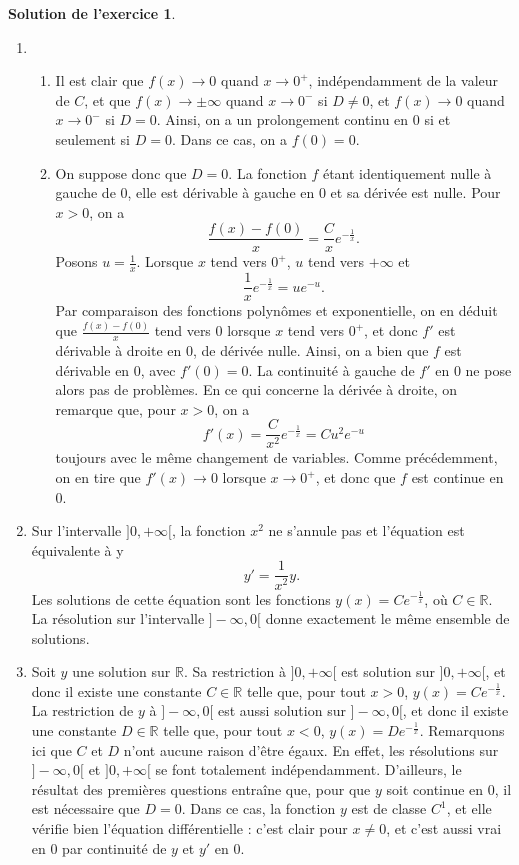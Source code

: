 \documentclass[a4paper, 11pt,openany]{article}%
\theoremstyle{plain}
\theoremstyle{definition}
\newtheorem{sol}{Solution de l'exercice}
\theoremstyle{remark}
\newcommand{\R}{\mathbb{R}}
\begin{document}
\begin{sol}
\begin{enumerate}
\item 
\begin{enumerate}
\item Il est clair que $f(x) \to 0$ quand $x \to 0^+$, indépendamment de la valeur de $C$, et que $f(x) \to \pm \infty$ quand $x \to 0^-$ si $D \neq 0$, et $f(x) \to 0$ quand $x \to 0^-$ si $D=0$. Ainsi, on a un prolongement continu en 0 si et seulement si $D=0$. Dans ce cas, on a $f(0)=0$. 
\item On suppose donc que $D=0$. La fonction $f$ étant identiquement nulle à gauche de 0, elle est dérivable à gauche en 0 et sa dérivée est nulle. Pour $x>0$, on a 
\[ \frac{f(x)-f(0)}{x}=\frac{C}{x} e^{-\frac{1}{x}}.\]
Posons $u= \frac{1}{x}$. Lorsque $x$ tend vers $0^+$, $u$ tend vers $+\infty$ et \[ \frac{1}{x} e^{- \frac{1}{x}} = u e^{-u}.\]
Par comparaison des fonctions polynômes et exponentielle, on en déduit que $\frac{f(x)-f(0)}{x}$ tend vers 0 lorsque $x$ tend vers $0^+$, et donc $f'$ est dérivable à droite en 0, de dérivée nulle. Ainsi, on a bien que $f$ est dérivable en 0, avec $f'(0)=0$. La continuité à gauche de $f'$ en 0 ne pose alors pas de problèmes. En ce qui concerne la dérivée à droite, on remarque que, pour $x>0$, on a \[ f'(x)=\frac{C}{x^2} e^{-\frac{1}{x}} = Cu^2 e^{-u}\]
toujours avec le même changement de variables. Comme précédemment, on en tire que $f'(x) \to 0$ lorsque $x \to 0^+$, et donc que $f$ est continue en 0. 
\end{enumerate}
\item Sur l'intervalle $]0,+\infty[$, la fonction $x^2$ ne s'annule pas et l'équation est équivalente à y
\[ y'= \frac{1}{x^2} y.\]
Les solutions de cette équation sont les fonctions $y(x)=C e^{-\frac{1}{x}}$, où $C \in \R$. La résolution sur l'intervalle $]-\infty,0[$ donne exactement le même ensemble de solutions. 
\item Soit $y$ une solution sur $\R$. Sa restriction à $]0,+ \infty[$ est solution sur $]0,+\infty[$, et donc il existe une constante $C \in \R$ telle que, pour tout $x>0$, $y(x)=C e^{-\frac{1}{x}}$. La restriction de $y$ à $]-\infty,0[$ est aussi solution sur $]-\infty,0[$, et donc il existe une constante $D \in \R$ telle que, pour tout $x<0$, $y(x)=De^{-\frac{1}{x}}$. Remarquons ici que $C$ et $D$ n'ont aucune raison d'être égaux. En effet, les résolutions sur $]-\infty,0[$ et $]0,+\infty[$ se font totalement indépendamment.
D'ailleurs, le résultat des premières questions entraîne que, pour que $y$ soit continue en 0, il est nécessaire que $D=0$. Dans ce cas, la fonction $y$ est de classe $C^1$, et elle vérifie bien l'équation différentielle : c'est clair pour $x \neq 0$, et c'est aussi vrai en 0 par continuité de $y$ et $y'$ en 0. 
\end{enumerate} 
\end{sol}
   
\end{document}
